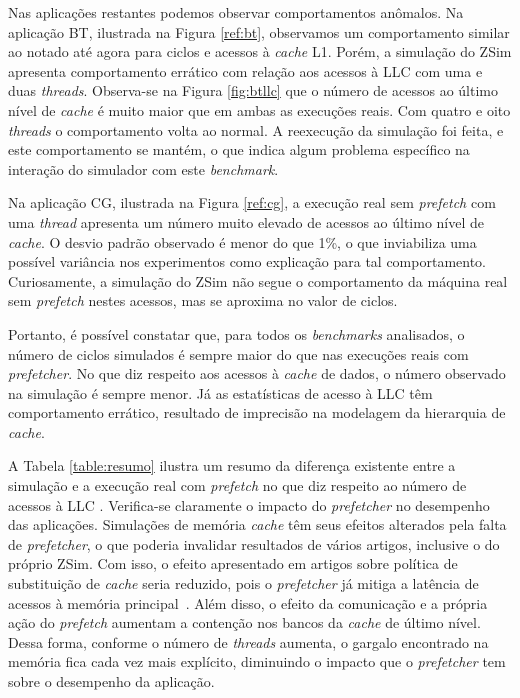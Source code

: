 \documentclass[12pt]{article}
\begin{document}



\vspace{-2mm}
Nas aplicações restantes podemos observar comportamentos anômalos.
Na aplicação BT, ilustrada na Figura \ref{ref:bt}, observamos um comportamento similar ao notado até agora para ciclos e acessos à \textit{cache} L1.
Porém, a simulação do ZSim apresenta comportamento errático com relação aos acessos à LLC com uma e duas \emph{threads}. Observa-se na Figura \ref{fig:btllc} que o número de acessos ao último nível de \textit{cache} é muito maior que em ambas as execuções reais.
Com quatro e oito \emph{threads} o comportamento volta ao normal.
A reexecução da simulação foi feita, e este comportamento se mantém, o que indica algum problema específico na interação do simulador com este \textit{benchmark}. %

\vspace{-2mm}
Na aplicação CG, ilustrada na Figura \ref{ref:cg}, a execução real sem \textit{prefetch} com uma \emph{thread} apresenta um número muito elevado de acessos ao último nível de \textit{cache}.
O desvio padrão observado é menor do que 1\%, o que inviabiliza uma possível variância nos experimentos como explicação para tal comportamento.
Curiosamente, a simulação do ZSim não segue o comportamento da máquina real sem \textit{prefetch} nestes acessos, mas se aproxima no valor de ciclos. 


\vspace{-2mm}
Portanto, é possível constatar que, para todos os \textit{benchmarks} analisados, o número de ciclos simulados é sempre maior do que nas execuções reais com \textit{prefetcher}. 
No que diz respeito aos acessos à \textit{cache} de dados, o número observado na simulação é sempre menor.
Já as estatísticas de acesso à LLC têm comportamento errático, resultado de imprecisão na modelagem da hierarquia de \textit{cache}.




\vspace{-2mm}
A Tabela \ref{table:resumo} ilustra um resumo da diferença existente entre a simulação e a execução real com \textit{prefetch} no que diz respeito ao número de acessos à LLC . 
Verifica-se claramente o impacto do \textit{prefetcher} no desempenho das aplicações.
Simulações de memória \textit{cache} têm seus efeitos alterados pela falta de \textit{prefetcher}, o que poderia invalidar resultados de vários artigos, inclusive o do próprio ZSim.
Com isso, o efeito apresentado em artigos sobre política de substituição de \textit{cache} seria reduzido, pois o \textit{prefetcher} já mitiga a latência de acessos à memória principal~\cite{jain2018rethinking}.
Além disso, o efeito da comunicação e a própria ação do \textit{prefetch} aumentam a contenção nos bancos da \textit{cache} de último nível.
Dessa forma, conforme o número de \textit{threads} aumenta, o gargalo encontrado na memória fica cada vez mais explícito, diminuindo o impacto que o \textit{prefetcher} tem sobre o desempenho da aplicação.
\end{document}
